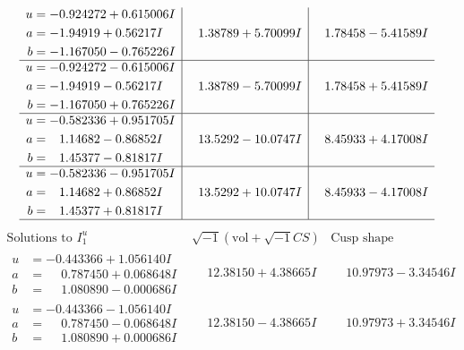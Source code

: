 \documentclass[1p]{elsarticle_modified}
\theoremstyle{definition}
\newcommand{\I}{\sqrt{-1}}
\begin{document}
$$\begin{array}{c|c|c}
\begin{aligned}
u &= -0.924272 + 0.615006 I \\
a &= -1.94919 + 0.56217 I \\
b &= -1.167050 - 0.765226 I\end{aligned}
 & \phantom{-}1.38789 + 5.70099 I & \phantom{-}1.78458 - 5.41589 I \\ \hline\begin{aligned}
u &= -0.924272 - 0.615006 I \\
a &= -1.94919 - 0.56217 I \\
b &= -1.167050 + 0.765226 I\end{aligned}
 & \phantom{-}1.38789 - 5.70099 I & \phantom{-}1.78458 + 5.41589 I \\ \hline\begin{aligned}
u &= -0.582336 + 0.951705 I \\
a &= \phantom{-}1.14682 - 0.86852 I \\
b &= \phantom{-}1.45377 - 0.81817 I\end{aligned}
 & \phantom{-}13.5292 - 10.0747 I & \phantom{-}8.45933 + 4.17008 I \\ \hline\begin{aligned}
u &= -0.582336 - 0.951705 I \\
a &= \phantom{-}1.14682 + 0.86852 I \\
b &= \phantom{-}1.45377 + 0.81817 I\end{aligned}
 & \phantom{-}13.5292 + 10.0747 I & \phantom{-}8.45933 - 4.17008 I\\
 \hline 
 \end{array}$$\newpage$$\begin{array}{c|c|c}  
\text{Solutions to }I^u_{1}& \I (\text{vol} + \sqrt{-1}CS) & \text{Cusp shape}\\
 \hline 
\begin{aligned}
u &= -0.443366 + 1.056140 I \\
a &= \phantom{-}0.787450 + 0.068648 I \\
b &= \phantom{-}1.080890 - 0.000686 I\end{aligned}
 & \phantom{-}12.38150 + 4.38665 I & \phantom{-}10.97973 - 3.34546 I \\ \hline\begin{aligned}
u &= -0.443366 - 1.056140 I \\
a &= \phantom{-}0.787450 - 0.068648 I \\
b &= \phantom{-}1.080890 + 0.000686 I\end{aligned}
 & \phantom{-}12.38150 - 4.38665 I & \phantom{-}10.97973 + 3.34546 I \\ \hline\begin{aligned}

\end{aligned}
\end{array}$$
\end{document}
